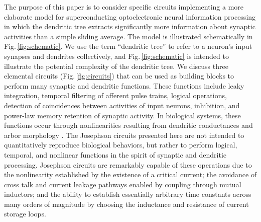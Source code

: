 \documentclass[twocolumn]{article}
\begin{document}
\begin{figure}[tb]
\end{figure}
The purpose of this paper is to consider specific circuits implementing a more elaborate model for superconducting optoelectronic neural information processing in which the dendritic tree extracts significantly more information about synaptic activities than a simple sliding average. The model is illustrated schematically in Fig.\,\ref{fig:schematic}. We use the term ``dendritic tree'' to refer to a neuron's input synapses and dendrites collectively, and Fig.\,\ref{fig:schematic} is intended to illustrate the potential complexity of the dendritic tree. We discuss three elemental circuits (Fig.\,\ref{fig:circuits}) that can be used as building blocks to perform many synaptic and dendritic functions. These functions include leaky integration, temporal filtering of afferent pulse trains, logical operations, detection of coincidences between activities of input neurons, inhibition, and power-law memory retention of synaptic activity. In biological systems, these functions occur through nonlinearities resulting from dendritic conductances and arbor morphology \cite{stse2007,stsp2015}. The Josephson circuits presented here are not intended to quantitatively reproduce biological behaviors, but rather to perform logical, temporal, and nonlinear functions in the spirit of synaptic and dendritic processing. Josephson circuits are remarkably capable of these operations due to the nonlinearity established by the existence of a critical current; the avoidance of cross talk and current leakage pathways enabled by coupling through mutual inductors; and the ability to establish essentially arbitrary time constants across many orders of magnitude by choosing the inductance and resistance of current storage loops. 
\end{document}
